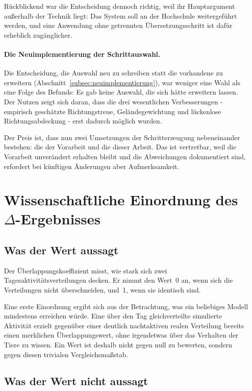 \documentclass[12pt,a4paper]{report}
\begin{document}
Rückblickend war die Entscheidung dennoch richtig, weil ihr Hauptargument außerhalb der
Technik liegt: Das System soll an der Hochschule weitergeführt werden, und eine Anwendung
ohne getrennten Übersetzungsschritt ist dafür erheblich zugänglicher.

\paragraph{Die Neuimplementierung der Schrittauswahl.} Die Entscheidung, die Auswahl neu zu
schreiben statt die vorhandene zu erweitern (Abschnitt~\ref{subsec:neuimplementierung}), war
weniger eine Wahl als eine Folge des Befunds: Es gab keine Auswahl, die sich hätte erweitern
lassen. Der Nutzen zeigt sich daran, dass die drei wesentlichen Verbesserungen - empirisch
geschätzte Richtungstreue, Geländegewichtung und lückenlose Richtungsabdeckung - erst
dadurch möglich wurden.

Der Preis ist, dass nun zwei Umsetzungen der Schritterzeugung nebeneinander bestehen: die
der Vorarbeit und die dieser Arbeit. Das ist vertretbar, weil die Vorarbeit unverändert
erhalten bleibt und die Abweichungen dokumentiert sind, erfordert bei künftigen Änderungen
aber Aufmerksamkeit.

\section{Wissenschaftliche Einordnung des \texorpdfstring{$\Delta$}{Delta}-Ergebnisses}
\label{sec:einordnung-delta}

\subsection{Was der Wert aussagt}
\label{subsec:was-delta-aussagt}

Der Überlappungskoeffizient misst, wie stark sich zwei Tagesaktivitätsverteilungen decken.
Er nimmt den Wert~0 an, wenn sich die Verteilungen nicht überschneiden, und~1, wenn sie
identisch sind.

Eine erste Einordnung ergibt sich aus der Betrachtung, was ein beliebiges Modell mindestens
erreichen würde. Eine über den Tag gleichverteilte simulierte Aktivität erzielt gegenüber
einer deutlich nachtaktiven realen Verteilung bereits einen merklichen Überlappungswert,
ohne irgendetwas über das Verhalten der Tiere zu wissen. Ein Wert ist deshalb nicht gegen
null zu bewerten, sondern gegen diesen trivialen Vergleichsmaßstab.

\subsection{Was der Wert nicht aussagt}
\label{subsec:was-delta-nicht-aussagt}
\end{document}
